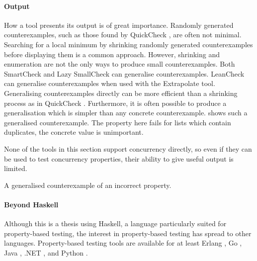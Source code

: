 \paragraph{Output}
How a tool presents its output is of great importance.  Randomly
generated counterexamples, such as those found by
QuickCheck \parencite{claessen2000}, are often not minimal.  Searching for a
local minimum by shrinking randomly generated counterexamples before
displaying them is a common approach.  However, shrinking and
enumeration are not the only ways to produce small counterexamples.
Both SmartCheck \parencite{pike2014} and Lazy SmallCheck \parencite{runciman2008}
can generalise counter\-examples.  LeanCheck \parencite{leancheck} can
generalise counterexamples when used with the
Extrapolate \parencite{braquehais2017ifl} tool.  Generalising
counterexamples directly can be more efficient than a shrinking
process as in QuickCheck \parencite{pike2014}.  Furthermore, it is often
possible to produce a generalisation which is simpler than any
concrete counterexample.   shows such a generalised
counterexample.  The property here fails for lists which contain
duplicates, the concrete value is unimportant.

None of the tools in this section support concurrency directly, so
even if they can be used to test concurrency properties, their ability
to give useful output is limited.

\begin{listing}
\centering
{}
\caption{A generalised counterexample of an incorrect property.}\label{lst:gencntr}
\end{listing}

\paragraph{Beyond Haskell}
Although this is a thesis using Haskell, a language particularly
suited for property-based testing, the interest in property-based
testing has spread to other languages.  Property-based testing tools
are available for at least Erlang \parencite{arts2006}, Go
\parencite{testing_quick}, Java
\parencite{parameterized_tests,junit_quickcheck}, .NET
\parencite{random_attribute,values_attribute}, and Python
\parencite{hypothesis_python}.

